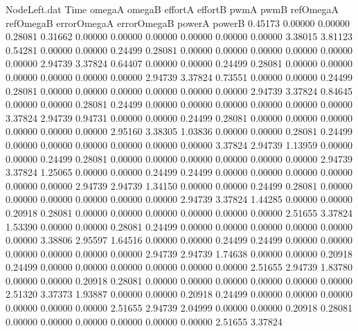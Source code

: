 \begin{filecontents}{NodeLeft.dat}
Time omegaA omegaB effortA effortB pwmA pwmB refOmegaA refOmegaB errorOmegaA errorOmegaB powerA powerB
   0.45173    0.00000    0.00000     0.28081    0.31662    0.00000    0.00000    0.00000    0.00000    0.00000    0.00000    3.38015    3.81123
   0.54281    0.00000    0.00000     0.24499    0.28081    0.00000    0.00000    0.00000    0.00000    0.00000    0.00000    2.94739    3.37824
   0.64407    0.00000    0.00000     0.24499    0.28081    0.00000    0.00000    0.00000    0.00000    0.00000    0.00000    2.94739    3.37824
   0.73551    0.00000    0.00000     0.24499    0.28081    0.00000    0.00000    0.00000    0.00000    0.00000    0.00000    2.94739    3.37824
   0.84645    0.00000    0.00000     0.28081    0.24499    0.00000    0.00000    0.00000    0.00000    0.00000    0.00000    3.37824    2.94739
   0.94731    0.00000    0.00000     0.24499    0.28081    0.00000    0.00000    0.00000    0.00000    0.00000    0.00000    2.95160    3.38305
   1.03836    0.00000    0.00000     0.28081    0.24499    0.00000    0.00000    0.00000    0.00000    0.00000    0.00000    3.37824    2.94739
   1.13959    0.00000    0.00000     0.24499    0.28081    0.00000    0.00000    0.00000    0.00000    0.00000    0.00000    2.94739    3.37824
   1.25065    0.00000    0.00000     0.24499    0.24499    0.00000    0.00000    0.00000    0.00000    0.00000    0.00000    2.94739    2.94739
   1.34150    0.00000    0.00000     0.24499    0.28081    0.00000    0.00000    0.00000    0.00000    0.00000    0.00000    2.94739    3.37824
   1.44285    0.00000    0.00000     0.20918    0.28081    0.00000    0.00000    0.00000    0.00000    0.00000    0.00000    2.51655    3.37824
   1.53390    0.00000    0.00000     0.28081    0.24499    0.00000    0.00000    0.00000    0.00000    0.00000    0.00000    3.38806    2.95597
   1.64516    0.00000    0.00000     0.24499    0.24499    0.00000    0.00000    0.00000    0.00000    0.00000    0.00000    2.94739    2.94739
   1.74638    0.00000    0.00000     0.20918    0.24499    0.00000    0.00000    0.00000    0.00000    0.00000    0.00000    2.51655    2.94739
   1.83780    0.00000    0.00000     0.20918    0.28081    0.00000    0.00000    0.00000    0.00000    0.00000    0.00000    2.51320    3.37373
   1.93887    0.00000    0.00000     0.20918    0.24499    0.00000    0.00000    0.00000    0.00000    0.00000    0.00000    2.51655    2.94739
   2.04999    0.00000    0.00000     0.20918    0.28081    0.00000    0.00000    0.00000    0.00000    0.00000    0.00000    2.51655    3.37824

\end{filecontents}

